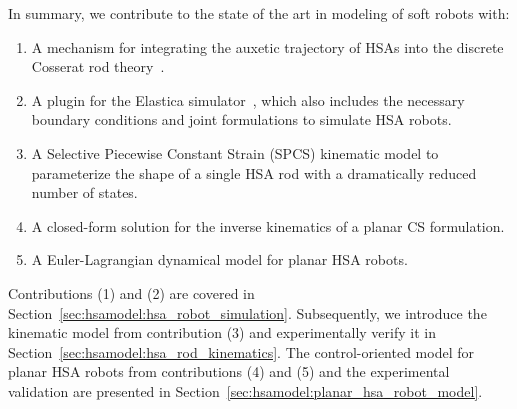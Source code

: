 In summary, we contribute to the state of the art in modeling of soft robots with:
%
\begin{enumerate}
    \item A mechanism for integrating the auxetic trajectory of \glspl{HSA} into the discrete Cosserat rod theory~\cite{gazzola2018forward, mathew2022sorosim}. %
    \item A plugin for the Elastica simulator~\cite{naughton2021elastica}, which also includes the necessary boundary conditions and joint formulations to simulate \gls{HSA} robots.
    \item A Selective Piecewise Constant Strain (SPCS) kinematic model to parameterize the shape of a single \gls{HSA} rod with a dramatically reduced number of states. %
    \item A closed-form solution for the inverse kinematics of a planar \gls{CS} formulation.
    \item A Euler-Lagrangian dynamical model for planar \gls{HSA} robots.
\end{enumerate}
Contributions (1) and (2) are covered in Section~\ref{sec:hsamodel:hsa_robot_simulation}. Subsequently, we introduce the kinematic model from contribution (3) and experimentally verify it in Section~\ref{sec:hsamodel:hsa_rod_kinematics}. The control-oriented model for planar \gls{HSA} robots from contributions (4) and (5) and the experimental validation are presented in Section~\ref{sec:hsamodel:planar_hsa_robot_model}.